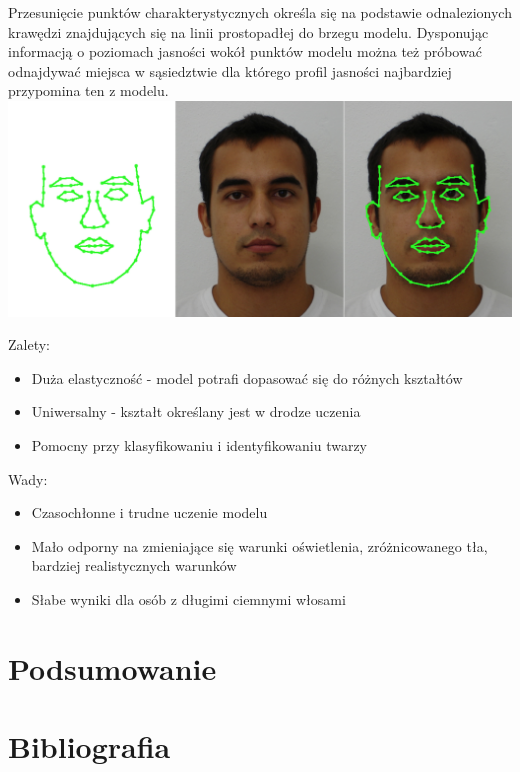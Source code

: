\documentclass[11pt,a4paper]{article}
\begin{document}
Przesunięcie punktów charakterystycznych określa się na podstawie odnalezionych krawędzi znajdujących się na linii prostopadłej do brzegu modelu. Dysponując informacją o poziomach jasności wokół punktów modelu można też próbować odnajdywać miejsca w sąsiedztwie dla którego profil jasności najbardziej przypomina ten z modelu. \\

\vspace*{1cm}
\includegraphics[scale=0.40]{active_shape.png}
\vspace*{1cm}

\noindent 
Zalety:
\begin{itemize}
\item Duża elastyczność - model potrafi dopasować się do różnych kształtów
\item Uniwersalny - kształt określany jest w drodze uczenia
\item Pomocny przy klasyfikowaniu i identyfikowaniu twarzy
\end{itemize}

\noindent 
Wady:
\begin{itemize}
\item  Czasochłonne i trudne uczenie modelu 
\item  Mało odporny na zmieniające się warunki oświetlenia, zróżnicowanego tła, bardziej realistycznych warunków
\item  Słabe wyniki dla osób z długimi ciemnymi włosami
\end{itemize}

\section{Podsumowanie}

\section{Bibliografia}



\end{document}
